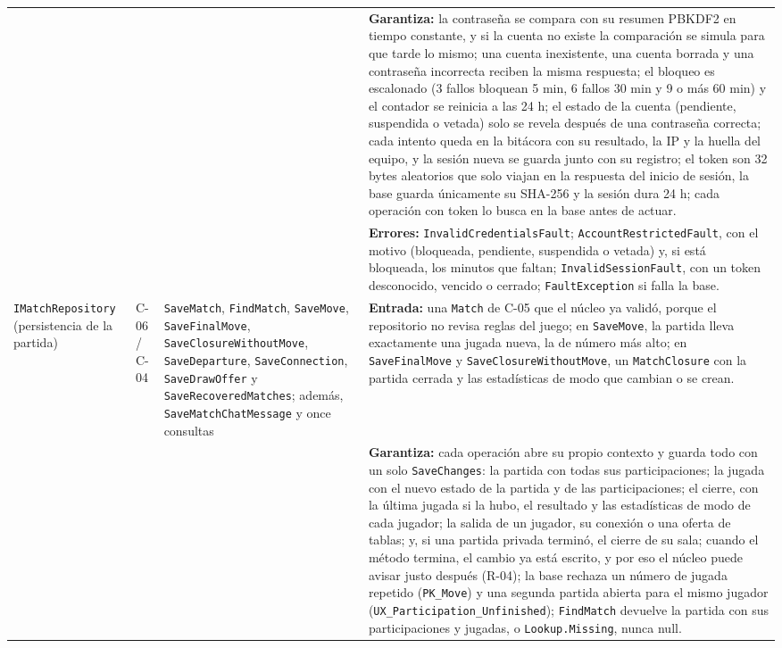 \documentclass[11pt,letterpaper]{article}
\begin{document}
\begin{xltabular}{\linewidth}{|>{\small\raggedright\arraybackslash}p{3cm}|>{\small\raggedright\arraybackslash}p{1.8cm}|>{\small\raggedright\arraybackslash}p{2.8cm}|Y|}
    & & & \textbf{Garantiza:} la contraseña se compara con su resumen PBKDF2 en tiempo constante, y si la cuenta no existe la comparación se simula para que tarde lo mismo; una cuenta inexistente, una cuenta borrada y una contraseña incorrecta reciben la misma respuesta; el bloqueo es escalonado (3 fallos bloquean 5 min, 6 fallos 30 min y 9 o más 60 min) y el contador se reinicia a las 24 h; el estado de la cuenta (pendiente, suspendida o vetada) solo se revela después de una contraseña correcta; cada intento queda en la bitácora con su resultado, la IP y la huella del equipo, y la sesión nueva se guarda junto con su registro; el token son 32 bytes aleatorios que solo viajan en la respuesta del inicio de sesión, la base guarda únicamente su SHA-256 y la sesión dura 24 h; cada operación con token lo busca en la base antes de actuar.\\
    & & & \textbf{Errores:} \texttt{InvalidCredentialsFault}; \texttt{AccountRestrictedFault}, con el motivo (bloqueada, pendiente, suspendida o vetada) y, si está bloqueada, los minutos que faltan; \texttt{InvalidSessionFault}, con un token desconocido, vencido o cerrado; \texttt{FaultException} si falla la base.\\\hline
  \texttt{IMatchRepository} (persistencia de la partida) & C-06 / C-04 & \texttt{SaveMatch}, \texttt{FindMatch}, \texttt{SaveMove}, \texttt{SaveFinal\allowbreak Move}, \texttt{SaveClosure\allowbreak WithoutMove}, \texttt{Save\allowbreak Departure}, \texttt{Save\allowbreak Connection}, \texttt{SaveDraw\allowbreak Offer} y \texttt{SaveRecovered\allowbreak Matches}; además, \texttt{SaveMatch\allowbreak ChatMessage} y once consultas & \textbf{Entrada:} una \texttt{Match} de C-05 que el núcleo ya validó, porque el repositorio no revisa reglas del juego; en \texttt{SaveMove}, la partida lleva exactamente una jugada nueva, la de número más alto; en \texttt{SaveFinalMove} y \texttt{SaveClosure\allowbreak WithoutMove}, un \texttt{MatchClosure} con la partida cerrada y las estadísticas de modo que cambian o se crean.\\
    & & & \textbf{Garantiza:} cada operación abre su propio contexto y guarda todo con un solo \texttt{SaveChanges}: la partida con todas sus participaciones; la jugada con el nuevo estado de la partida y de las participaciones; el cierre, con la última jugada si la hubo, el resultado y las estadísticas de modo de cada jugador; la salida de un jugador, su conexión o una oferta de tablas; y, si una partida privada terminó, el cierre de su sala; cuando el método termina, el cambio ya está escrito, y por eso el núcleo puede avisar justo después (R-04); la base rechaza un número de jugada repetido (\texttt{PK\_Move}) y una segunda partida abierta para el mismo jugador (\texttt{UX\_Participation\_Unfinished}); \texttt{FindMatch} devuelve la partida con sus participaciones y jugadas, o \texttt{Lookup.Missing}, nunca null.\\

\end{xltabular}
\end{document}
